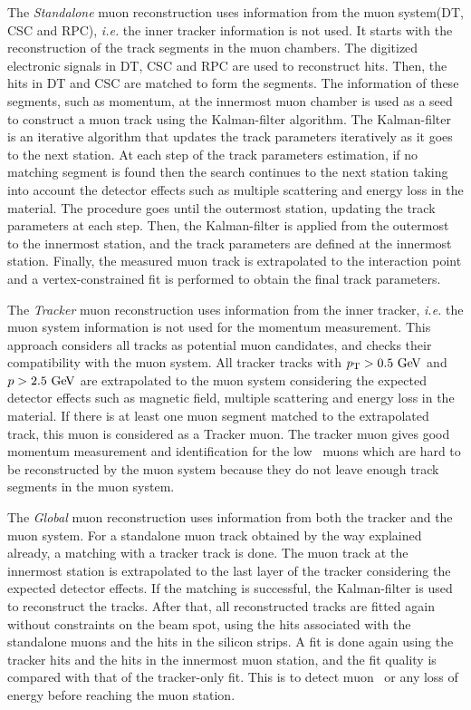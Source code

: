 The \textit{Standalone} muon reconstruction uses information from 
the muon system(DT, CSC and RPC), \textit{i.e.} the inner tracker information is not used. 
It starts with the reconstruction of the track segments in the muon chambers. 
The digitized electronic signals in DT, CSC and RPC are used to 
reconstruct hits. Then, the hits in DT and CSC are matched to form the segments. 
The information of these segments, such as momentum, at the innermost 
muon chamber is used as a seed to construct a muon track using the Kalman-filter 
algorithm. The Kalman-filter is an iterative algorithm 
that updates the track parameters iteratively as it goes to the next station. 
At each step of the track parameters estimation, if no matching segment is found 
then the search continues to the next station taking into account the detector 
effects such as multiple scattering and energy loss in the material. 
The procedure goes until the outermost station, updating the track parameters 
at each step. Then, the Kalman-filter is applied from the outermost to 
the innermost station, and the track parameters are defined at the innermost 
station. Finally, the measured muon track is extrapolated to the interaction 
point and a vertex-constrained fit is performed to obtain the final track parameters. 

The \textit{Tracker} muon reconstruction uses information from  
the inner tracker, \textit{i.e.} the muon system information is not used
for the momentum measurement. This approach considers all tracks as 
potential muon candidates, and checks their compatibility with the 
muon system. All tracker tracks with $p_\mathrm{T}>0.5~\mathrm{Ge\kern -0.1em V}$ and $p>2.5~\mathrm{Ge\kern -0.1em V}$ 
are extrapolated to the muon system considering the expected detector effects 
such as magnetic field, multiple scattering and energy loss in the material. 
If there is at least one muon segment matched to the 
extrapolated track, this muon is considered as a Tracker muon. 
The tracker muon gives good momentum measurement and identification 
for the low \pt\ muons which are hard to be reconstructed by the muon system
because they do not leave enough track segments in the muon system. 

The \textit{Global} muon reconstruction uses information from both the tracker 
and the muon system. For a standalone muon track obtained by the way explained 
already, a matching with a tracker track is done. 
The muon track at the innermost station is extrapolated to the last layer 
of the tracker considering the expected detector effects.
If the matching is successful, the Kalman-filter is used to reconstruct the tracks. 
After that, all reconstructed tracks are fitted again without constraints on the 
beam spot, using the hits associated with the standalone muons and the hits 
in the silicon strips. A fit is done again using the tracker hits and the 
hits in the innermost muon station, and the fit quality is compared with 
that of the tracker-only fit. This is to detect muon \brem\  or 
any loss of energy before reaching the muon station.

